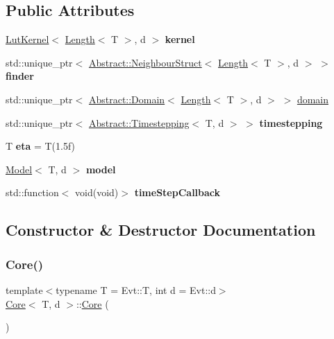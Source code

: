 \subsection*{Public Attributes}
\begin{DoxyCompactItemize}
\item 
\hypertarget{classCore_ad3ef153613ec5a30383b556684df4ccb}{}\label{classCore_ad3ef153613ec5a30383b556684df4ccb} 
\hyperlink{classLutKernel}{Lut\+Kernel}$<$ \hyperlink{classBaseUnit}{Length}$<$ T $>$, d $>$ {\bfseries kernel}
\item 
\hypertarget{classCore_a5d9b38289dc06e76ee20bbf0fe59de67}{}\label{classCore_a5d9b38289dc06e76ee20bbf0fe59de67} 
std\+::unique\+\_\+ptr$<$ \hyperlink{classAbstract_1_1NeighbourStruct}{Abstract\+::\+Neighbour\+Struct}$<$ \hyperlink{classBaseUnit}{Length}$<$ T $>$, d $>$ $>$ {\bfseries finder}
\item 
std\+::unique\+\_\+ptr$<$ \hyperlink{classAbstract_1_1Domain}{Abstract\+::\+Domain}$<$ \hyperlink{classBaseUnit}{Length}$<$ T $>$, d $>$ $>$ \hyperlink{classCore_ac87630cef479b2beaa9ac6cc207e9ee2}{domain}
\item 
\hypertarget{classCore_afabdfe5fa54fb6b5b839a20fcb350f22}{}\label{classCore_afabdfe5fa54fb6b5b839a20fcb350f22} 
std\+::unique\+\_\+ptr$<$ \hyperlink{classAbstract_1_1Timestepping}{Abstract\+::\+Timestepping}$<$ T, d $>$ $>$ {\bfseries timestepping}
\item 
\hypertarget{classCore_ad0a6ee8134df0c3f908d4635dfebffe2}{}\label{classCore_ad0a6ee8134df0c3f908d4635dfebffe2} 
T {\bfseries eta} = T(1.\+5f)
\item 
\hypertarget{classCore_acbe48633bf36b971607c04127c15ad24}{}\label{classCore_acbe48633bf36b971607c04127c15ad24} 
\hyperlink{classModel}{Model}$<$ T, d $>$ {\bfseries model}
\item 
\hypertarget{classCore_a988cf9ead455a6cb3299dd203556ae09}{}\label{classCore_a988cf9ead455a6cb3299dd203556ae09} 
std\+::function$<$ void(void)$>$ {\bfseries time\+Step\+Callback}
\end{DoxyCompactItemize}


\subsection{Constructor \& Destructor Documentation}
\hypertarget{classCore_ab22806e0a6b4cc36e65d37949412b375}{}\label{classCore_ab22806e0a6b4cc36e65d37949412b375} 
\subsubsection{\texorpdfstring{Core()}{Core()}}
{\footnotesize\ttfamily template$<$typename T  = Evt\+::T, int d = Evt\+::d$>$ \\
\hyperlink{classCore}{Core}$<$ T, d $>$\+::\hyperlink{classCore}{Core} (\begin{DoxyParamCaption}{ }\end{DoxyParamCaption})\hspace{0.3cm}{\ttfamily [inline]}}

